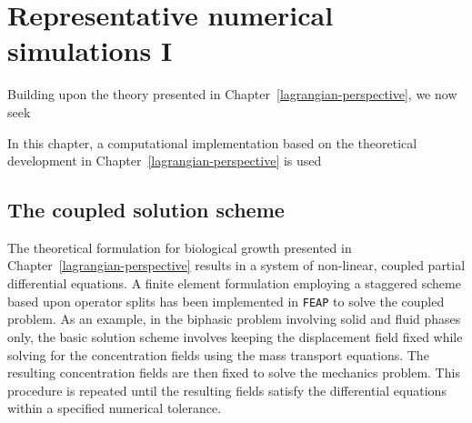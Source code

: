 \chapter{Representative numerical simulations I}
\label{numerical-simulations-1}

Building upon the theory presented in
Chapter~\ref{lagrangian-perspective}, we now seek 

In this chapter, a computational implementation based on the
theoretical development in Chapter~\ref{lagrangian-perspective} is
used 


\section{The coupled solution scheme}
\label{solution-scheme-1}

The theoretical formulation for biological growth presented in
Chapter~\ref{lagrangian-perspective} results in a system of
non-linear, coupled partial differential equations. A finite element
formulation employing a staggered scheme based upon operator splits
\cite{Armero-poroplasticity:99,Garikipatiox2:01} has been implemented
in {\tt FEAP} \citep{feapmanual} to solve the coupled problem. As an
example, in the biphasic problem involving solid and fluid phases
only, the basic solution scheme involves keeping the displacement
field fixed while solving for the concentration fields using the mass
transport equations. The resulting concentration fields are then fixed
to solve the mechanics problem. This procedure is repeated until the
resulting fields satisfy the differential equations within a specified
numerical tolerance.

